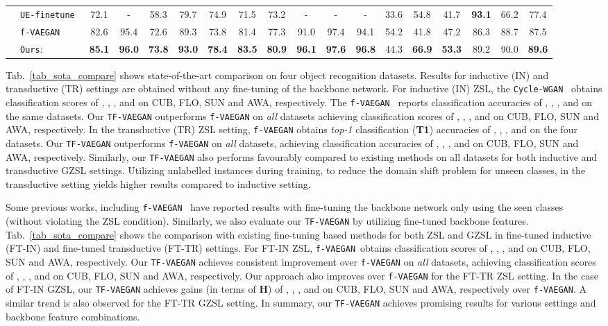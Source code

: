 \documentclass[runningheads]{llncs}
\newcommand{\vaegan}{\texttt{f-VAEGAN}}
\newcommand{\proposed}{\texttt{TF-VAEGAN}}
\begin{document}
\begin{table}[t]
{\begin{tabular}{llcccc|ccc|ccc|ccc|ccc}
& \texttt{UE-finetune}~\cite{song2018transductive} & 72.1 & - & 58.3 & 79.7 & 74.9 & 71.5 & 73.2 & - & - & -  &33.6 &54.8 &41.7& \textbf{93.1}& 66.2& 77.4 \\
& \texttt{\vaegan}~\cite{Xian19cvpr} &82.6 &95.4& 72.6& 89.3& 73.8& 81.4& 77.3& 91.0& 97.4& 94.1& 54.2& 41.8& 47.2& 86.3& 88.7& 87.5 \\
& \texttt{Ours}:  & \textbf{85.1} &\textbf{96.0} & \textbf{73.8}  & \textbf{93.0}  & \textbf{78.4}  & \textbf{83.5} & \textbf{80.9} & \textbf{96.1}  & \textbf{97.6} & \textbf{96.8} & 44.3  & \textbf{66.9} &  \textbf{53.3} & 89.2 & 90.0 &  \textbf{89.6} \\
\end{tabular}
}
\end{table}

Tab.~\ref{tab_sota_compare} shows state-of-the-art comparison on four object recognition datasets. Results for inductive (IN) and transductive (TR) settings are obtained without any fine-tuning of the backbone network. For inductive (IN) ZSL, the \texttt{Cycle-WGAN}~\cite{Rafael18eccv} obtains classification scores of , , , and  on CUB, FLO, SUN and AWA, respectively. The \vaegan~\cite{Xian19cvpr} reports classification accuracies of , , , and  on the same datasets. Our \proposed{} outperforms \vaegan{} on \emph{all} datasets achieving classification scores of , , , and  on CUB, FLO, SUN and AWA, respectively. 
In the transductive (TR) ZSL setting, \vaegan{} obtains \emph{top-1} classification (\textbf{T1}) accuracies of , , , and  on the four datasets. Our \proposed{} outperforms \vaegan{} on \emph{all} datasets, achieving classification accuracies of , , , and  on CUB, FLO, SUN and AWA, respectively. Similarly, our \proposed{} also performs favourably compared to existing methods on all datasets for both inductive and transductive GZSL settings. Utilizing unlabelled instances during training, to reduce the domain shift problem for unseen classes, in the transductive setting yields higher results compared to inductive setting.


Some previous works, including \vaegan~\cite{Xian19cvpr} have reported results with fine-tuning the backbone network only using the seen classes (without violating the ZSL condition). Similarly, we also evaluate our \proposed{} by utilizing fine-tuned backbone features. Tab.~\ref{tab_sota_compare} shows the comparison with existing fine-tuning based methods for both ZSL and GZSL in fine-tuned inductive (FT-IN) and fine-tuned transductive (FT-TR) settings. For FT-IN ZSL, \vaegan~obtains classification scores of , , , and  on CUB, FLO, SUN and AWA, respectively. Our \proposed{} achieves consistent improvement over \vaegan{} on \emph{all} datasets, achieving classification scores of , , , and  on CUB, FLO, SUN and AWA, respectively. Our approach also improves over \vaegan{} for the FT-TR ZSL setting. In the case of FT-IN GZSL, our \proposed{} achieves gains (in terms of \textbf{H}) of , , , and  on CUB, FLO, SUN and AWA, respectively over \vaegan. A similar trend is also observed for the FT-TR GZSL setting. 
In summary, our \proposed{} achieves promising results for various settings and backbone feature combinations. 
\end{document}
